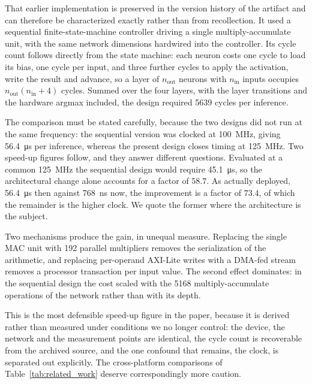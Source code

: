 \documentclass[final,5p,times,twocolumn]{elsarticle}
\begin{document}
That earlier implementation is preserved in the version history of the artifact
and can therefore be characterized exactly rather than from recollection. It used
a sequential finite-state-machine controller driving a single
multiply-accumulate unit, with the same network dimensions hardwired into the
controller. Its cycle count follows directly from the state machine: each neuron
costs one cycle to load its bias, one cycle per input, and three further cycles
to apply the activation, write the result and advance, so a layer of $n_{\text{out}}$
neurons with $n_{\text{in}}$ inputs occupies $n_{\text{out}}(n_{\text{in}}+4)$
cycles. Summed over the four layers, with the layer transitions and the hardware
argmax included, the design required \num{5639} cycles per inference.

The comparison must be stated carefully, because the two designs did not run at
the same frequency: the sequential version was clocked at \SI{100}{\mega\hertz},
giving \SI{56.4}{\micro\second} per inference, whereas the present design closes
timing at \SI{125}{\mega\hertz}. Two speed-up figures follow, and they answer
different questions. Evaluated at a common \SI{125}{\mega\hertz} the sequential
design would require \SI{45.1}{\micro\second}, so the architectural change alone
accounts for a factor of $58.7$. As actually deployed, \SI{56.4}{\micro\second}
then against \SI{768}{\nano\second} now, the improvement is a factor of $73.4$,
of which the remainder is the higher clock. We quote the former where the
architecture is the subject.

Two mechanisms produce the gain, in unequal measure. Replacing the single MAC
unit with 192 parallel multipliers removes the serialization of the arithmetic,
and replacing per-operand AXI-Lite writes with a DMA-fed stream removes a
processor transaction per input value. The second effect dominates: in the
sequential design the cost scaled with the \num{5168} multiply-accumulate
operations of the network rather than with its depth.

This is the most defensible speed-up figure in the paper, because it is derived
rather than measured under conditions we no longer control: the device, the
network and the measurement points are identical, the cycle count is recoverable
from the archived source, and the one confound that remains, the clock, is
separated out explicitly. The cross-platform comparisons of
Table~\ref{tab:related_work} deserve correspondingly more caution.
\end{document}
